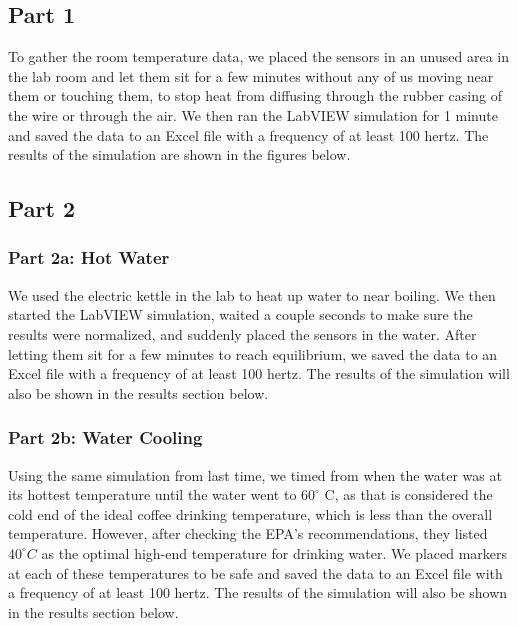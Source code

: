 \documentclass{article}
\begin{document}
\subsection{Part 1} %

To gather the room temperature data, we placed the sensors in an unused area in the lab room and let them sit for a few minutes without any of us moving near them or touching them, to stop heat from diffusing through the rubber casing of the wire or through the air. We then ran the LabVIEW simulation for 1 minute and saved the data to an Excel file with a frequency of at least 100 hertz. The results of the simulation are shown in the figures below.

\subsection{Part 2} %

\subsubsection{Part 2a: Hot Water} %

We used the electric kettle in the lab to heat up water to near boiling. We then started the LabVIEW simulation, waited a couple seconds to make sure the results were normalized, and suddenly placed the sensors in the water. After letting them sit for a few minutes to reach equilibrium, we saved the data to an Excel file with a frequency of at least 100 hertz. The results of the simulation will also be shown in the results section below.

\subsubsection{Part 2b: Water Cooling} %

Using the same simulation from last time, we timed from when the water was at its hottest temperature until the water went to \(60^\circ\) C, as that is considered the cold end of the ideal coffee drinking temperature, which is less than the overall temperature. However, after checking the EPA's recommendations, they listed \(40^\circ C\) as the optimal high-end temperature for drinking water. We placed markers at each of these temperatures to be safe and saved the data to an Excel file with a frequency of at least 100 hertz. The results of the simulation will also be shown in the results section below.
\end{document}
